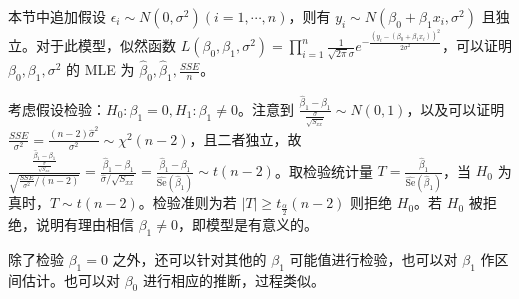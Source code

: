 \documentclass[../main.tex]{subfiles}
\begin{document}
本节中追加假设 $\epsilon_i\sim N(0,\sigma^2)(i=1,\cdots,n)$，则有 $y_i\sim N(\beta_0+\beta_1x_i,\sigma^2)$ 且独立。对于此模型，似然函数 $L(\beta_0,\beta_1,\sigma^2)=\prod_{i=1}^n\frac1{\sqrt{2\pi}\sigma}e^{-\frac{(y_i-(\beta_0+\beta_1x_i))^2}{2\sigma^2}}$，可以证明 $\beta_0,\beta_1,\sigma^2$ 的 MLE 为 $\hat\beta_0,\hat\beta_1,\frac{SSE}n$。

考虑假设检验：$H_0:\beta_1=0,H_1:\beta_1\neq0$。注意到 $\frac{\hat\beta_1-\beta_1}{\frac\sigma{\sqrt{S_{xx}}}}\sim N(0,1)$，以及可以证明 $\frac{SSE}{\sigma^2}=\frac{(n-2)\hat\sigma^2}{\sigma^2}\sim\chi^2(n-2)$，且二者独立，故 $\frac{\frac{\hat\beta_1-\beta_1}{\frac\sigma{\sqrt{S_{xx}}}}}{\sqrt{\frac{SSE}{\sigma^2}/(n-2)}}=\frac{\hat\beta_1-\beta_1}{\hat\sigma/\sqrt{S_{xx}}}=\frac{\hat\beta_1-\beta_1}{\widehat{\mathrm{Se}}(\hat\beta_1)}\sim t(n-2)$。取检验统计量 $T=\frac{\hat\beta_1}{\widehat{\mathrm{Se}}(\hat\beta_1)}$，当 $H_0$ 为真时，$T\sim t(n-2)$。检验准则为若 $|T|\geq t_{\frac\alpha2}(n-2)$ 则拒绝 $H_0$。若 $H_0$ 被拒绝，说明有理由相信 $\beta_1\neq0$，即模型是有意义的。

除了检验 $\beta_1=0$ 之外，还可以针对其他的 $\beta_1$ 可能值进行检验，也可以对 $\beta_1$ 作区间估计。也可以对 $\beta_0$ 进行相应的推断，过程类似。
\end{document}
